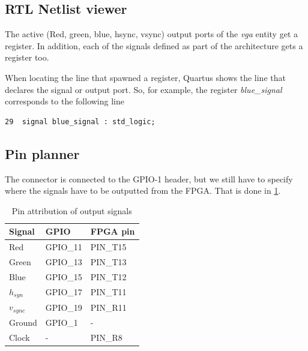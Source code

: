 \documentclass[12pt,a4paper,hyperlinks]{rapport_unif}
\begin{document}
\subsection{RTL Netlist viewer}
The active (Red, green, blue, hsync, vsync) output ports of the \emph{vga} entity get a register. In addition, each of the signals defined as part of the architecture gets a register too.

When locating the line that spawned a register, Quartus shows the line that declares the signal or output port. So, for example, the register  \emph{blue\_signal} corresponds to the following line

\begin{lstlisting}
29  signal blue_signal : std_logic;
\end{lstlisting}


\subsection{Pin planner}
The connector is connected to the GPIO-1 header, but we still have to specify where the signals have to be outputted from the FPGA. That is done in \cref{table:pins}. 

\begin{table}[htp]
\centering
\caption{Pin attribution of output signals}
\begin{tabularx}{\textwidth}{@{}X X X@{}}
\toprule
Signal & GPIO & FPGA pin\\
\midrule
Red & GPIO\_11 & PIN\_T15 \\
Green & GPIO\_13 & PIN\_T13 \\
Blue & GPIO\_15 & PIN\_T12 \\
$h_{syn}$ & GPIO\_17 & PIN\_T11 \\
$v_{sync}$ & GPIO\_19 & PIN\_R11 \\
Ground & GPIO\_1 & - \\
Clock & - & PIN\_R8 \\
\bottomrule
\end{tabularx}
\label{table:pins}
\end{table}
\end{document}
